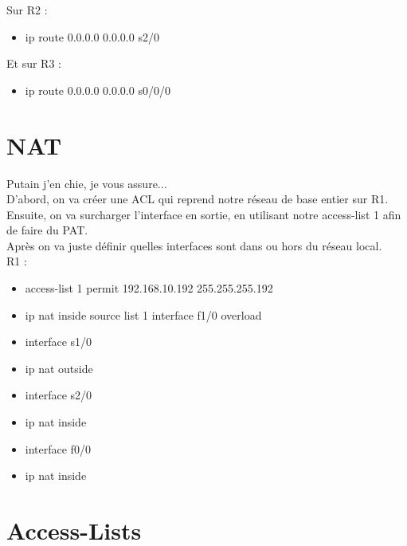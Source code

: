 \documentclass[a4paper,10pt,final,fleqn]{article}
\begin{document}
	Sur R2 : \\

	\begin{itemize}
		\item ip route 0.0.0.0 0.0.0.0 s2/0\\
	\end{itemize}

	Et sur R3 : \\

	\begin{itemize}
		\item ip route 0.0.0.0 0.0.0.0 s0/0/0\\
	\end{itemize}

\section{NAT}

	Putain j'en chie, je vous assure...\\

	D'abord, on va créer une ACL qui reprend notre réseau de base entier sur R1.\\
	Ensuite, on va surcharger l'interface en sortie, en utilisant notre access-list 1 afin de faire du PAT.\\
	Après on va juste définir quelles interfaces sont dans ou hors du réseau local.\\

	R1 : \\

	\begin{itemize}
		\item access-list 1 permit 192.168.10.192 255.255.255.192 
		\item ip nat inside source list 1 interface f1/0 overload\\
		\item interface s1/0
		\item ip nat outside
		\item interface s2/0
		\item ip nat inside
		\item interface f0/0
		\item ip nat inside\\
	\end{itemize}
	

\section{Access-Lists}
\end{document}
